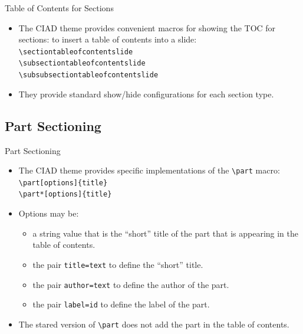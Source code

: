 \documentclass[english,sectioncirclenumberstyle]{ciadbeamer}
\begin{document}
\begin{frame}{Table of Contents for Sections}
	\begin{itemize}
	\item The CIAD theme provides convenient macros for showing the TOC for sections: to insert a table of contents into a slide: \\
		\texttt{{\textbackslash}sectiontableofcontentslide} \\
		\texttt{{\textbackslash}subsectiontableofcontentslide} \\
		\texttt{{\textbackslash}subsubsectiontableofcontentslide}
	\item They provide standard show/hide configurations for each section type.
	\end{itemize}
\end{frame}

\subsection{Part Sectioning}

\begin{frame}{Part Sectioning}
	\begin{itemize}
	\item The CIAD theme provides specific implementations of the \texttt{{\textbackslash}part} macro: \\
		\texttt{{\textbackslash}part[options]\{title\}} \\
		\texttt{{\textbackslash}part*[options]\{title\}}
	\vfill
	\item Options may be: \begin{itemize}
		\item a string value that is the ``short'' title of the part that is appearing in the table of contents.
		\item the pair \texttt{title=text} to define the ``short'' title.
		\item the pair \texttt{author=text} to define the author of the part.
		\item the pair \texttt{label=id} to define the label of the part.
		\end{itemize}
	\vfill
	\item The stared version of \texttt{{\textbackslash}part} does not add the part in the table of contents.
	\end{itemize}
\end{frame}
\end{document}
